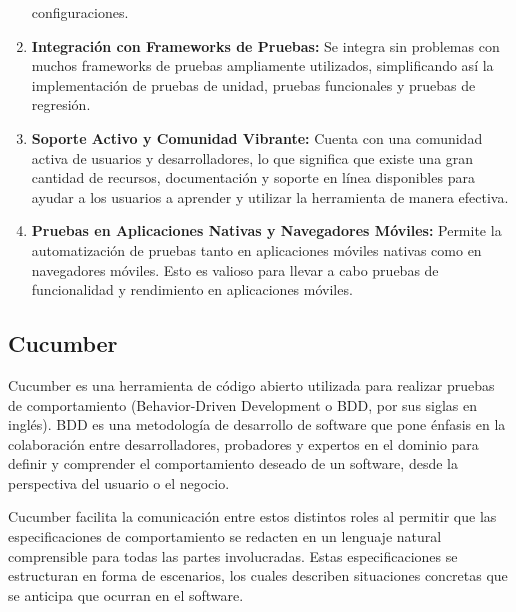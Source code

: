 \documentclass[letterpaper]{article}
\begin{document}
\begin{enumerate}[series=listWWNumxi,label=\arabic*.,ref=\arabic*]
configuraciones.
\item \textbf{Integración con Frameworks de Pruebas:} Se integra sin problemas con muchos frameworks de pruebas
ampliamente utilizados, simplificando así la implementación de pruebas de unidad, pruebas funcionales y pruebas de
regresión.
\item \textbf{Soporte Activo y Comunidad Vibrante:} Cuenta con una comunidad activa de usuarios y desarrolladores, lo
que significa que existe una gran cantidad de recursos, documentación y soporte en línea disponibles para ayudar a los
usuarios a aprender y utilizar la herramienta de manera efectiva.
\item \textbf{Pruebas en Aplicaciones Nativas y Navegadores Móviles:} Permite la automatización de pruebas tanto en
aplicaciones móviles nativas como en navegadores móviles. Esto es valioso para llevar a cabo pruebas de funcionalidad y
rendimiento en aplicaciones móviles.
\end{enumerate}
\subsection{Cucumber}
Cucumber es una herramienta de código abierto utilizada para realizar pruebas de comportamiento (Behavior-Driven
Development o BDD, por sus siglas en inglés). BDD es una metodología de desarrollo de software que pone énfasis en la
colaboración entre desarrolladores, probadores y expertos en el dominio para definir y comprender el comportamiento
deseado de un software, desde la perspectiva del usuario o el negocio.

Cucumber facilita la comunicación entre estos distintos roles al permitir que las especificaciones de comportamiento se
redacten en un lenguaje natural comprensible para todas las partes involucradas. Estas especificaciones se estructuran
en forma de escenarios, los cuales describen situaciones concretas que se anticipa que ocurran en el software.
\end{document}
